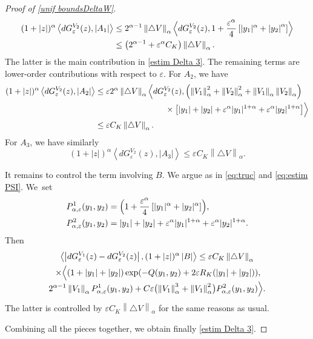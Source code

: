 \documentclass[JEP,XML,SOM,Unicode]{cedram}
\theoremstyle{plain}
\theoremstyle{definition}
\let\eps\varepsilon
\newcommand{\abs}[1]{\left\lvert#1\right\rvert}
\newcommand{\norm}[1]{\left\lVert#1\right\rVert}
\newcommand{\nalph}[1]{\left\lVert#1\right\rVert_\alpha}
\newcommand{\dQVA}{dG_\eps^{V_1}}
\newcommand{\dQVB}{dG_\eps^{V_2}}
\newcommand{\RK}{R_K}
\begin{document}
\begin{proof}[Proof of \cref{unif boundsDeltaW}]
\begin{align*}
(1+\abs{z})^\alpha \left\langle \dQVB(z), \abs{ A_1} \right \rangle &\leq 2^{\alpha - 1} \norm{\triangle V}_\alpha	\Bigl\langle \dQVB(z), 1 + \frac{\eps^\alpha}4 \left[\vert y_1 \vert^\alpha + \abs{y_2}^\alpha\right] \Bigr\rangle\\
& \leq \left (2^{\alpha - 1} + \eps^\alpha C_K\right) \norm{\triangle V}_\alpha.
\end{align*}
The latter is the main contribution in \eqref{estim Delta 3}. The remaining terms are lower-order contributions with respect to $\eps$.
For $A_2$, we have
\begin{align*}
(1+\abs{z})^\alpha \left\langle \dQVB(z), \abs{ A_2} \right \rangle &\leq \eps 2^{\alpha} \norm{\triangle V }_\alpha \Bigl\langle \dQVB(z), \left(\nalph{V_1}^2+\nalph{V_2}^2+ \nalph{V_1} \nalph{V_2} \right)\\
&\hspace*{3cm}\times\left[\vert y_1 \vert+ \vert y_2 \vert + \eps^\alpha \vert y_1 \vert^{1+\alpha} + \eps^\alpha\vert y_2 \vert^{1+\alpha} \right] \Bigr \rangle\\
& \leq \eps C_K \norm{\triangle V }_\alpha.
\end{align*}
For $A_3$, we have similarly
\begin{equation*}
(1+\abs{z})^\alpha \left\langle \dQVB(z), \abs{ A_3} \right \rangle \leq \eps C_K \norm{\triangle V }_\alpha.
\end{equation*}

It remains to control the term involving $B$. We argue as in \eqref{eq:truc} and \eqref{eq:estim PSI}. We~set
\begin{align*}
P^1_{\alpha,\eps}(y_1,y_2)&=\Bigl (1+ \frac{\eps^\alpha}4 \left[\vert y_1 \vert^{\alpha}+ \vert y_2 \vert^{\alpha} \right] \Bigr),\\
P^2_{\alpha,\eps}(y_1,y_2)&=\vert y_1 \vert+ \vert y_2 \vert + \eps^\alpha\vert y_1 \vert^{1+\alpha} + \eps^\alpha\vert y_2 \vert^{1+\alpha}.
\end{align*}
Then
\begin{multline*}
\left\langle \abs{ \dQVA(z)- \dQVB(z) }, (1+\abs{z})^\alpha\abs{B} \right\rangle
\leq \eps C_K \norm{\triangle V}_\alpha\\
\shoveleft{\times \Bigl\langle (1+ \abs{y_1} + \abs{y_2}) \exp (-Q(y_1,y_2) + 2\eps \RK(\abs{y_1}+\abs{y_2})),}\\[-3pt]
2^{\alpha-1} \norm{V_1}_\alpha P^1_{\alpha,\eps}(y_1,y_2)
+ C \eps \bigl (\norm{V_1}_\alpha^3 + \norm{V_1}_\alpha^2\bigr) P^2_{\alpha,\eps}(y_1,y_2)\Bigr\rangle.
\end{multline*}
The latter is controlled by $ \eps C_K \norm{\triangle V }_\alpha$ for the same reasons as usual.

Combining all the pieces together, we obtain finally \eqref{estim Delta 3}.
\end{proof}
\end{document}

